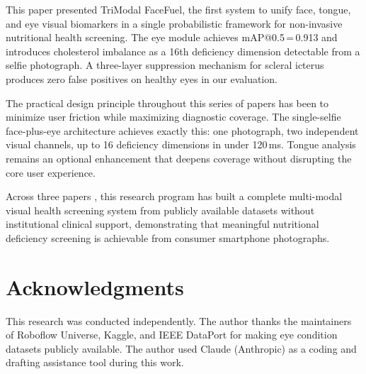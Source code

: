 \documentclass[journal]{IEEEtran}
\begin{document}
This paper presented TriModal FaceFuel, the first system to unify face,
tongue, and eye visual biomarkers in a single probabilistic framework
for non-invasive nutritional health screening. The eye module achieves
mAP@0.5\,=\,0.913 and introduces cholesterol imbalance as a 16th
deficiency dimension detectable from a selfie photograph. A three-layer
suppression mechanism for scleral icterus produces zero false positives
on healthy eyes in our evaluation.

The practical design principle throughout this series of papers has been
to minimize user friction while maximizing diagnostic coverage. The
single-selfie face-plus-eye architecture achieves exactly this: one
photograph, two independent visual channels, up to 16 deficiency
dimensions in under 120\,ms. Tongue analysis remains an optional
enhancement that deepens coverage without disrupting the core user
experience.

Across three papers \cite{muhammad2026facefuel,muhammad2026bimodal},
this research program has built a complete multi-modal visual health
screening system from publicly available datasets without institutional
clinical support, demonstrating that meaningful nutritional deficiency
screening is achievable from consumer smartphone photographs.

\section*{Acknowledgments}

This research was conducted independently. The author thanks the maintainers
of Roboflow Universe, Kaggle, and IEEE DataPort for making eye condition
datasets publicly available.
The author used Claude (Anthropic) as a coding and drafting assistance
tool during this work.
\nocite{muhammad2026trimodal}  %


\end{document}
